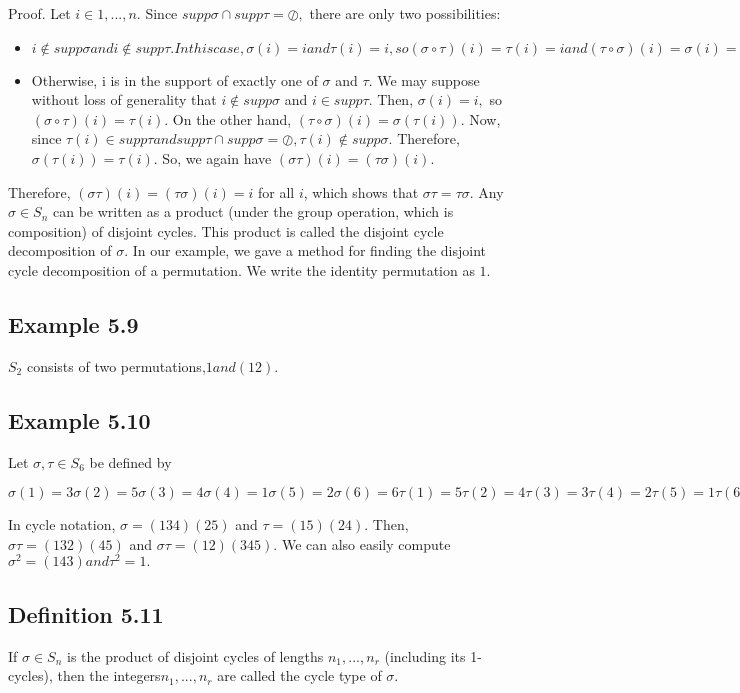 Proof. Let $i\in{1, . . . , n}.$ Since $supp \sigma\cap supp \tau = \oslash,$ there are only two possibilities:
\begin{itemize}
\item $i \notin supp \sigma and i \notin supp \tau. In this case, \sigma(i) = i and \tau(i) = i, so (\sigma \circ \tau)(i) =\tau(i) = i and
(\tau \circ \sigma)(i) = \sigma(i) = i.$

\item Otherwise, i is in the support of exactly one of $\sigma$ and $\tau$. We may suppose without loss of generality that
$i \notin supp \sigma$ and $i \in supp \tau.$ Then, $\sigma(i) = i,$ so $(\sigma \circ \tau)(i) = \tau(i).$ On the other hand, $(\tau \circ \sigma)(i) = \sigma(\tau(i)).$
Now, since $\tau(i) \in supp \tau and supp \tau \cap supp \sigma = \oslash, \tau(i) \notin supp \sigma.$ Therefore, $\sigma(\tau(i)) = \tau(i).$ So, we
again have $(\sigma\tau)(i) = (\tau\sigma)(i).$
\end{itemize}

Therefore, $(\sigma \tau)(i) = (\tau \sigma)(i) = i$ for all $i$, which shows that $\sigma \tau= \tau \sigma.$
Any $\sigma \in S_n$ can be written as a product (under the group operation, which is composition) of disjoint cycles.
This product is called the disjoint cycle decomposition of $\sigma.$ In our example, we gave a method for finding
the disjoint cycle decomposition of a permutation.
We write the identity permutation as $1$.

\subsection{Example 5.9} $S_2$ consists of two permutations,$ 1 and (1 2).$

\subsection{Example 5.10} Let $\sigma, \tau \in S_6$ be defined by

$\sigma(1) = 3 \sigma(2) = 5 \sigma(3) = 4 \sigma(4) = 1 \sigma(5) = 2 \sigma(6) = 6
\tau(1) = 5 \tau(2) = 4 \tau(3) = 3 \tau(4) = 2 \tau(5) = 1 \tau(6) = 6$

In cycle notation, $\sigma = (1 3 4)(2 5)$ and $\tau = (1 5)(2 4)$. Then, $\sigma \tau= (1 3 2) (4 5)$ and $\sigma \tau= (1 2)(3 4 5)$. We
can also easily compute $\sigma^2 = (1 4 3) and \tau^2 = 1.$

\subsection{Definition 5.11} If $\sigma \in S_n$ is the product of disjoint cycles of lengths $n_1, . . . , n_r$ (including its 1-cycles),
then the integers$ n_1, . . . , n_r$ are called the cycle type of $\sigma$.

